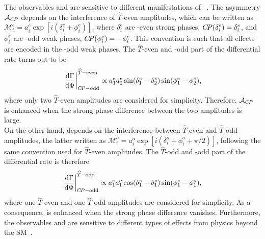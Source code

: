 The observables \DACP and \ACP are sensitive to different manifestations of \CPV~\cite{Durieux:2015zwa}.
The \CP asymmetry $\mathcal{A}_{{C\!P}}$ depends on the interference of $\widehat{T}$-even amplitudes, which can be written as $\mathcal{M}^e_i = a^e_i \exp\left[i(\delta^e_i+\phi_i^e)\right]$, where $\delta^e_i$ are \CP-even strong phases, ${C\!P}(\delta^e_i) = \delta^e_i$, and $\phi_i^e$ are \CP-odd weak phases, ${C\!P}(\phi_i^e)=-\phi_i^e$. This convention is such that all \CPV effects are encoded in the \CP-odd weak phases. The $\widehat{T}$-even and \CP-odd part of the differential rate turns out to be
\begin{equation}
\left.\frac{\rm d\Gamma}{\rm d\Phi} \right|^{\widehat{T}-{\rm even}}_{{C\!P}-{\rm odd}} \propto a^e_1 a^e_2 \sin(\delta_1^e-\delta_2^e)\sin(\phi_1^e-\phi_2^e),
\end{equation}
where only two $\widehat{T}$-even amplitudes are considered for simplicity.
Therefore, $\mathcal{A}_{{C\!P}}$ is enhanced when the strong phase difference between the two amplitudes is large.\\
On the other hand, \ACP depends on the interference between $\widehat{T}$-even and $\widehat{T}$-odd amplitudes, the latter written as $\mathcal{M}^o_i = a^o_i \exp\left[i(\delta^o_i+\phi_i^o+\pi/2)\right]$, following the same convention used for $\widehat{T}$-even amplitudes. The $\widehat{T}$-odd and \CP-odd part of the differential rate is therefore
\begin{equation}
\left.\frac{\rm d\Gamma}{\rm d\Phi} \right|^{\widehat{T}-{\rm odd}}_{{C\!P}-{\rm odd}} \propto a^e_1 a^o_1 \cos(\delta_1^e-\delta_1^o)\sin(\phi_1^e-\phi_1^o),
\end{equation}
where one $\widehat{T}$-even and one $\widehat{T}$-odd amplitudes are considered for simplicity.
As a consequence, \ACP is enhanced when the strong phase difference vanishes. Furthermore, the observables \DACP and \ACP are sensitive to different types of \CPV effects from physics beyond the SM~\cite{Alok:2011gv}.